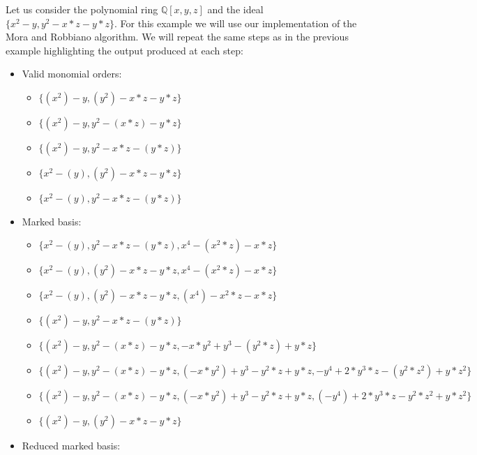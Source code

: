 \begin{example}
  Let us consider the polynomial ring $\mathbb{Q}[x, y, z]$ and
  the ideal $\{x^2  - y, y^2  - x*z - y*z\}$. For this example we will
  use our implementation of the Mora and Robbiano algorithm. We will
  repeat the same steps as in the previous example highlighting the output
  produced at each step:

  \begin{itemize}
  \item Valid monomial orders:

    \begin{itemize}
      \item $\{(x^2) - y, (y^2) - x*z - y*z\}$ 
      \item $\{(x^2) - y, y^2 - (x*z) - y*z\}$ 
      \item $\{(x^2) - y, y^2 - x*z - (y*z)\}$ 
      \item $\{x^2 - (y), (y^2) - x*z - y*z\}$ 
      \item $\{x^2 - (y), y^2 - x*z - (y*z)\}$ 
    \end{itemize}

  \item Marked \grob basis:

    \begin{itemize}
      \item $\{x^2 - (y), y^2 - x*z - (y*z), x^4 - (x^2*z) - x*z\}$
      \item $\{x^2 - (y), (y^2) - x*z - y*z, x^4 - (x^2*z) - x*z\}$
      \item $\{x^2 - (y), (y^2) - x*z - y*z, (x^4) - x^2*z - x*z\}$
      \item $\{(x^2) - y, y^2 - x*z - (y*z)\}$
      \item $\{(x^2) - y, y^2 - (x*z) - y*z, -x*y^2 + y^3 - (y^2*z) + y*z\}$
      \item $\{(x^2) - y, y^2 - (x*z) - y*z, (-x*y^2) + y^3 - y^2*z + y*z, -y^4 + 2*y^3*z - (y^2*z^2) + y*z^2\}$
      \item $\{(x^2) - y, y^2 - (x*z) - y*z, (-x*y^2) + y^3 - y^2*z + y*z, (-y^4) + 2*y^3*z - y^2*z^2 + y*z^2\}$
      \item $\{(x^2) - y, (y^2) - x*z - y*z\}$
    \end{itemize}

  \item Reduced marked \grob basis:


\end{itemize}
\end{example}
